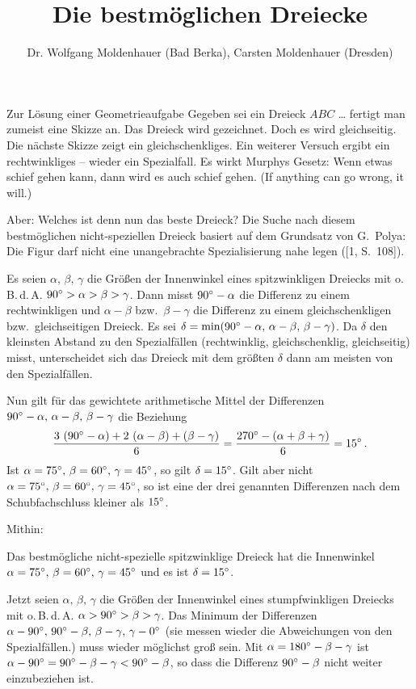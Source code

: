 \documentclass[10pt]{article}
\author{Dr. Wolfgang Moldenhauer (Bad Berka), Carsten Moldenhauer (Dresden)}
\title{Die {\glqq}bestmöglichen{\grqq} Dreiecke\kosemnetlicensemark}
\date{}
\begin{document}
 
\maketitle 

Zur Lösung einer Geometrieaufgabe {\glqq}Gegeben sei ein Dreieck $ABC$
\ldots{\grqq} fertigt man zumeist eine Skizze an. Das Dreieck wird gezeichnet.
Doch es wird gleichseitig. Die nächste Skizze zeigt ein gleichschenkliges. Ein
weiterer Versuch ergibt ein rechtwinkliges -- wieder ein Spezialfall. Es wirkt
Murphys Gesetz: Wenn etwas schief gehen kann, dann wird es auch schief gehen.
(If anything can go wrong, it will.)

Aber: Welches ist denn nun das {\glqq}beste{\grqq} Dreieck?  Die Suche nach
diesem bestmöglichen nicht-speziellen Dreieck basiert auf dem Grundsatz von
G.~Polya: {\glqq}Die Figur darf nicht eine unangebrachte Spezialisierung nahe
legen{\grqq} ([1, S.~108]).

Es seien $\alpha,\, \beta,\, \gamma$ die Größen der Innenwinkel eines
spitzwinkligen Dreiecks mit o.\,B.\,d.\,A. $90^{\circ}>\alpha>\beta>\gamma$.
Dann misst $90^{\circ}-\alpha$ die Differenz zu einem rechtwinkligen und
$\alpha-\beta$ bzw.\ $\beta-\gamma$ die Differenz zu einem gleichschenkligen
bzw.\ gleichseitigen Dreieck. Es sei $\delta = \min(90^{\circ}-\alpha,\,
\alpha-\beta,\, \beta-\gamma)$. Da $\delta$ den kleinsten Abstand zu den
Spezialfällen (rechtwinklig, gleichschenklig, gleichseitig) misst,
unterscheidet sich das Dreieck mit dem größten $\delta$ dann am meisten von
den Spezialfällen.

Nun gilt für das gewichtete arithmetische Mittel der Differenzen
$90^{\circ}-\alpha,\, \alpha-\beta,\, \beta-\gamma$ die Beziehung
\begin{gather*}
  \frac{3\,\left(90^{\circ}-\alpha\right) + 2\,\left(\alpha-\beta\right) + \left(\beta-\gamma\right)}{6}
  = \frac{270^{\circ}-\left(\alpha+\beta+\gamma\right)}{6} = 15^{\circ}\,.
\end{gather*}
Ist $\alpha=75^{\circ},\, \beta=60^{\circ},\, \gamma=45^{\circ}$, so gilt
$\delta=15^{\circ}$.  Gilt aber nicht $\alpha=75^{\circ},\, \beta=60^{\circ},\,
\gamma=45^{\circ}$, so ist eine der drei genannten Differenzen nach dem
Schubfachschluss kleiner als $15^{\circ}$.

Mithin:
\begin{satz}
  Das bestmögliche nicht-spezielle spitzwinklige Dreieck hat die Innenwinkel
  $\alpha=75^{\circ},\, \beta=60^{\circ},\, \gamma=45^{\circ}$ und es ist
  $\delta=15^{\circ}$.
\end{satz}

Jetzt seien $\alpha,\, \beta,\, \gamma$ die Größen der Innenwinkel eines
stumpfwinkligen Dreiecks mit o.\,B.\,d.\,A. $\alpha>90^{\circ}>\beta>\gamma$.
Das Minimum der Differenzen $\alpha-90^{\circ},\, 90^{\circ}-\beta,\,
\beta-\gamma,\, \gamma-0^{\circ}$ (sie messen wieder die Abweichungen von den
Spezialfällen.)  muss wieder möglichst groß sein. Mit
$\alpha=180^{\circ}-\beta-\gamma$ ist $\alpha-90^{\circ} = 90^{\circ}-\beta-\gamma <
90^{\circ}-\beta$, so dass die Differenz $90^{\circ}-\beta$ nicht weiter
einzubeziehen ist.
\end{document}
